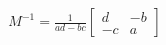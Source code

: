 \documentclass[preview]{standalone}
\begin{document}
\begin{align*}
M^{-1} = \frac{1}{ad-bc} \begin{bmatrix} d & -b \\ -c & a \end{bmatrix}
\end{align*}
\end{document}
